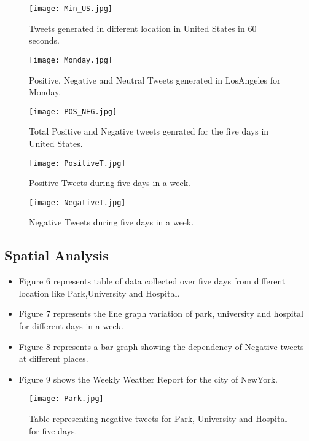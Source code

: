 \documentclass[12pt, oneside]{article}   	%
\begin{document}
\begin{figure}[h]
	\centering
	\texttt{[image: Min\_US.jpg]}\\
	\caption{Tweets generated in different location in United States in 60 seconds.}
\end{figure}

\begin{figure}[h]
	\centering
	\texttt{[image: Monday.jpg]}\\
	\caption{ Positive, Negative and Neutral Tweets generated in LosAngeles for Monday.}
\end{figure}


\vspace{2cm}

\begin{figure}[!htb]
	\centering
	\texttt{[image: POS\_NEG.jpg]}
	\caption{ Total Positive  and Negative tweets genrated for the five days in United States.}
\end{figure}

\begin{figure}[!htb]
	\centering
	\texttt{[image: PositiveT.jpg]}\\
	\caption{ Positive Tweets during five days in a week.}
\end{figure}

\begin{figure}[!htb]
	\centering
	\texttt{[image: NegativeT.jpg]}\\
	\caption{Negative Tweets during five days in a week.}
\end{figure}

\subsection{Spatial Analysis}

\begin{itemize}
	\item Figure 6 represents table of data collected over five days from different location like Park,University and Hospital.
	\item Figure 7 represents the line graph variation of park, university and hospital for different days in a week.
	\item Figure 8 represents a bar graph showing the dependency of Negative tweets at different places.
	\item Figure 9 shows the Weekly Weather Report for the city of NewYork. 
\end{itemize}
\begin{figure}[!htb]
	\centering
	\texttt{[image: Park.jpg]}\\
	\caption{ Table representing negative tweets for Park, University and Hospital for five days.}
\end{figure}
\end{document}
